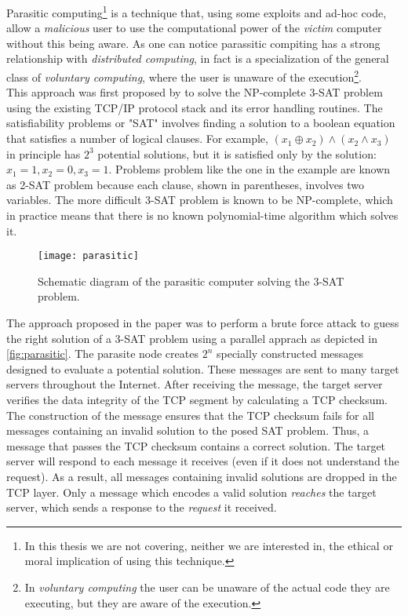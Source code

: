 
Parasitic computing\footnote{In this thesis we are not covering, neither
we are interested in, the ethical or moral implication of using this technique.}
is a technique that, using some exploits and ad-hoc code, allow a \emph{malicious}
user to use the computational power of the \emph{victim} computer without this
being aware. As one can notice parassitic compiting has a strong relationship
with \emph{distributed computing}, in fact is a specialization of the general
class of \emph{voluntary computing}, where the user is unaware of
the execution\footnote{In \emph{voluntary computing} the user can be unaware
of the actual code they are executing, but they are aware of the execution.}.\\

This approach was first proposed by \cite{barabasi2001parasitic} to solve the
NP-complete 3-SAT problem using the existing TCP/IP protocol stack and its error
handling routines. The satisfiability problems or "SAT" involves finding a
solution to a boolean equation that satisfies a number of logical clauses. For
example, $(x_1 \oplus x_2) \land (x_2 \land x_3 )$ in principle has $2^3$ potential
solutions, but it is satisfied only by the solution: $x_1=1, x_2=0, x_3=1$.
Problems problem like the one in the example are known as 2-SAT problem because
each clause, shown in parentheses, involves two variables. The more difficult
3-SAT problem is known to be NP-complete, which in practice means that there is
no known polynomial-time algorithm which solves it.\\
\begin{figure}[htb]
    \centering
    \texttt{[image: parasitic]}
    \caption{Schematic diagram of the parasitic computer solving the 3-SAT
    problem.}
    \label{fig:parasitic}
\end{figure}

The approach proposed in the paper was to perform a brute force attack to guess
the right solution of a 3-SAT problem using a parallel apprach as depicted in
\autoref{fig:parasitic}. The parasite node creates $2^n$ specially constructed
messages designed to evaluate a potential solution. These messages are sent to
many target servers throughout the Internet. After receiving the message, the
target server verifies the data integrity of the TCP segment by calculating a
TCP checksum. The construction of the message ensures that the TCP checksum fails
for all messages containing an invalid solution to the posed SAT problem. Thus,
a message that passes the TCP checksum contains a correct solution. The target
server will respond to each message it receives (even if it does not understand
the request). As a result, all messages containing invalid solutions are dropped
in the TCP layer. Only a message which encodes a valid solution \emph{reaches}
the target server, which sends a response to the \emph{request} it received.\\

